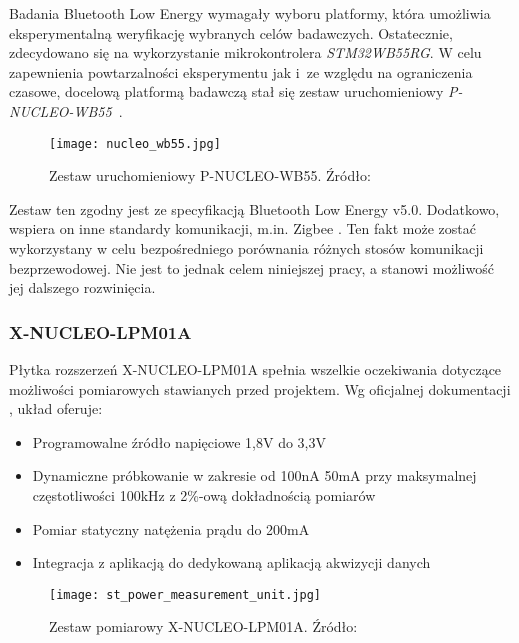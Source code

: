 Badania Bluetooth Low Energy wymagały wyboru platformy, która umożliwia eksperymentalną 
weryfikację wybranych celów badawczych. Ostatecznie, zdecydowano się na wykorzystanie 
mikrokontrolera \textit{STM32WB55RG}. W celu zapewnienia powtarzalności eksperymentu jak 
i~ze względu na ograniczenia czasowe, docelową platformą badawczą stał się zestaw 
uruchomieniowy \textit{P-NUCLEO-WB55}~\cite{noauthor_p-nucleo-wb55_nodate}.

\begin{figure}[!htb]
	\centering \texttt{[image: nucleo\_wb55.jpg]}
	\caption{Zestaw uruchomieniowy P-NUCLEO-WB55. Źródło: \cite{noauthor_p-nucleo-wb55_nodate}}
	\label{rys:nucleo_wb55}
\end{figure}

Zestaw ten zgodny jest ze specyfikacją Bluetooth Low Energy v5.0. Dodatkowo, wspiera
on inne standardy komunikacji, m.in. Zigbee \cite{noauthor_stm32wb_2022}.
Ten fakt może zostać wykorzystany w celu bezpośredniego porównania różnych stosów komunikacji bezprzewodowej.
Nie jest to jednak celem niniejszej pracy, a stanowi możliwość jej dalszego 
rozwinięcia.


\subsubsection{X-NUCLEO-LPM01A}

Płytka rozszerzeń X-NUCLEO-LPM01A spełnia wszelkie oczekiwania dotyczące możliwości pomiarowych
stawianych przed projektem. Wg oficjalnej dokumentacji \cite{noauthor_um2243_2018}, układ oferuje:

\begin{itemize}
\item Programowalne źródło napięciowe 1,8V do 3,3V
\item Dynamiczne próbkowanie w zakresie od 100nA 50mA przy maksymalnej częstotliwości 100kHz z 2\%-ową dokładnością pomiarów
\item Pomiar statyczny natężenia prądu do 200mA
\item Integracja z aplikacją do dedykowaną aplikacją akwizycji danych \cite{noauthor_stm32cubemonpwr_2022}
\end{itemize}

\begin{figure}[!ht]
	\centering \texttt{[image: st\_power\_measurement\_unit.jpg]}
	\caption{Zestaw pomiarowy X-NUCLEO-LPM01A. Źródło: \cite{noauthor_x-nucleo-lpm01a_nodate}}
	\label{rys:nucleo_lpm01a}
\end{figure}

